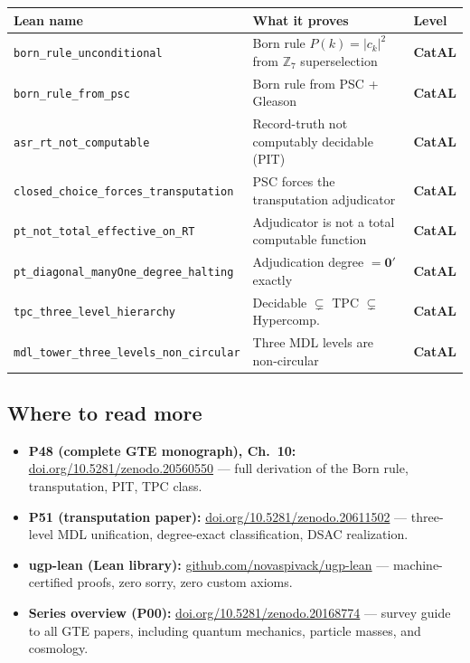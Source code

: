 \documentclass[11pt,a4paper]{article}
\newcommand{\lean}[1]{\texttt{#1}}
\newcommand{\CatAL}{\textbf{CatAL}}
\begin{document}
\begin{center}
\small
\begin{tabular}{p{5.8cm}p{5.3cm}p{1.2cm}}
\toprule
\textbf{Lean name} & \textbf{What it proves} & \textbf{Level} \\
\midrule
\lean{born\_rule\_unconditional} & Born rule $P(k)=|c_k|^2$ from $\mathbb{Z}_7$ superselection & \CatAL \\[4pt]
\lean{born\_rule\_from\_psc} & Born rule from PSC + Gleason & \CatAL \\[4pt]
\lean{asr\_rt\_not\_computable} & Record-truth not computably decidable (PIT) & \CatAL \\[4pt]
\lean{closed\_choice\_forces\_\allowbreak transputation} & PSC forces the transputation adjudicator & \CatAL \\[4pt]
\lean{pt\_not\_total\_effective\_on\_RT} & Adjudicator is not a total computable function & \CatAL \\[4pt]
\lean{pt\_diagonal\_manyOne\_\allowbreak degree\_halting} & Adjudication degree $= \mathbf{0}'$ exactly & \CatAL \\[4pt]
\lean{tpc\_three\_level\_hierarchy} & Decidable $\subsetneq$ TPC $\subsetneq$ Hypercomp. & \CatAL \\[4pt]
\lean{mdl\_tower\_three\_levels\_\allowbreak non\_circular} & Three MDL levels are non-circular & \CatAL \\
\bottomrule
\end{tabular}
\end{center}

\subsection{Where to read more}

\begin{itemize}
  \item \textbf{P48 (complete GTE monograph), Ch.~10:}
    \href{https://doi.org/10.5281/zenodo.20560550}{doi.org/10.5281/zenodo.20560550} ---
    full derivation of the Born rule, transputation, PIT, TPC class.
  \item \textbf{P51 (transputation paper):}
    \href{https://doi.org/10.5281/zenodo.20611502}{doi.org/10.5281/zenodo.20611502} ---
    three-level MDL unification, degree-exact classification, DSAC realization.
  \item \textbf{ugp-lean (Lean library):}
    \href{https://github.com/novaspivack/ugp-lean}{github.com/novaspivack/ugp-lean} ---
    machine-certified proofs, zero sorry, zero custom axioms.
  \item \textbf{Series overview (P00):}
    \href{https://doi.org/10.5281/zenodo.20168774}{doi.org/10.5281/zenodo.20168774} ---
    survey guide to all GTE papers, including quantum mechanics, particle masses, and cosmology.
\end{itemize}
\end{document}
